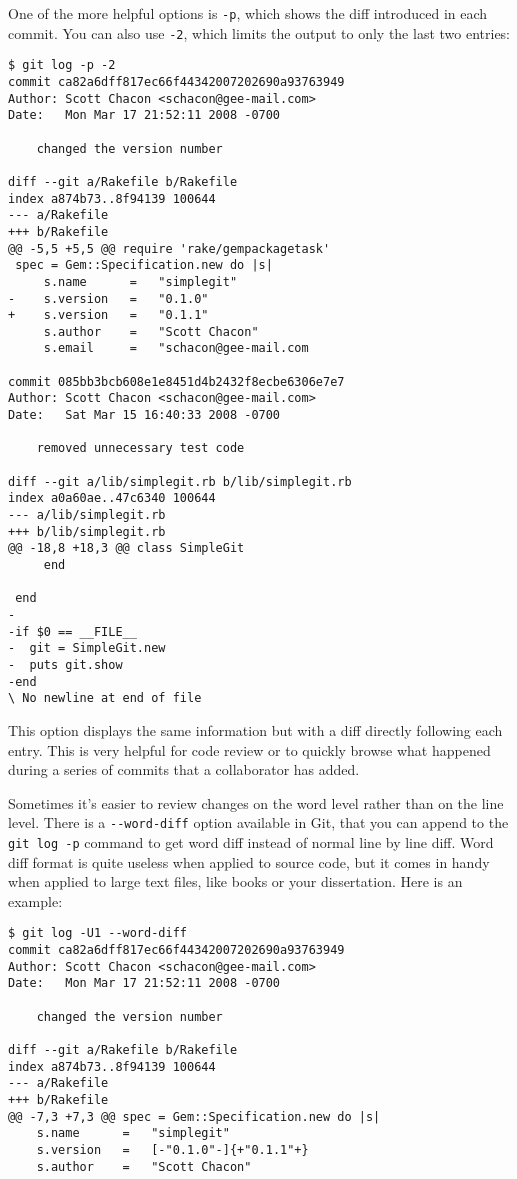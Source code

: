 \documentclass[a4paper]{book}
\begin{document}
One of the more helpful options is \texttt{-p}, which shows the diff introduced in each commit. You can also use \texttt{-2}, which limits the output to only the last two entries:

\begin{shaded}\begin{verbatim}
$ git log -p -2
commit ca82a6dff817ec66f44342007202690a93763949
Author: Scott Chacon <schacon@gee-mail.com>
Date:   Mon Mar 17 21:52:11 2008 -0700

    changed the version number

diff --git a/Rakefile b/Rakefile
index a874b73..8f94139 100644
--- a/Rakefile
+++ b/Rakefile
@@ -5,5 +5,5 @@ require 'rake/gempackagetask'
 spec = Gem::Specification.new do |s|
     s.name      =   "simplegit"
-    s.version   =   "0.1.0"
+    s.version   =   "0.1.1"
     s.author    =   "Scott Chacon"
     s.email     =   "schacon@gee-mail.com

commit 085bb3bcb608e1e8451d4b2432f8ecbe6306e7e7
Author: Scott Chacon <schacon@gee-mail.com>
Date:   Sat Mar 15 16:40:33 2008 -0700

    removed unnecessary test code

diff --git a/lib/simplegit.rb b/lib/simplegit.rb
index a0a60ae..47c6340 100644
--- a/lib/simplegit.rb
+++ b/lib/simplegit.rb
@@ -18,8 +18,3 @@ class SimpleGit
     end

 end
-
-if $0 == __FILE__
-  git = SimpleGit.new
-  puts git.show
-end
\ No newline at end of file
\end{verbatim}\end{shaded}

This option displays the same information but with a diff directly following each entry. This is very helpful for code review or to quickly browse what happened during a series of commits that a collaborator has added.

Sometimes it's easier to review changes on the word level rather than on the line level. There is a \texttt{-{}-word-diff} option available in Git, that you can append to the \texttt{git log -p} command to get word diff instead of normal line by line diff. Word diff format is quite useless when applied to source code, but it comes in handy when applied to large text files, like books or your dissertation. Here is an example:

\begin{shaded}\begin{verbatim}
$ git log -U1 --word-diff
commit ca82a6dff817ec66f44342007202690a93763949
Author: Scott Chacon <schacon@gee-mail.com>
Date:   Mon Mar 17 21:52:11 2008 -0700

    changed the version number

diff --git a/Rakefile b/Rakefile
index a874b73..8f94139 100644
--- a/Rakefile
+++ b/Rakefile
@@ -7,3 +7,3 @@ spec = Gem::Specification.new do |s|
    s.name      =   "simplegit"
    s.version   =   [-"0.1.0"-]{+"0.1.1"+}
    s.author    =   "Scott Chacon"
\end{verbatim}\end{shaded}
\end{document}
